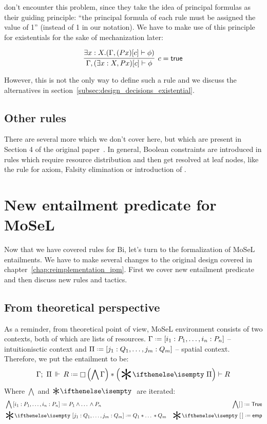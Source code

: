 \citet[page 5]{harlandResourceDistributionBooleanConstraints2003} don't encounter this problem, since they take the idea of principal formulas as their guiding principle: ``the principal formula of each rule must be assigned the value of 1'' (\true instead of 1 in our notation).
We have to make use of this principle for existentials for the sake of mechanization later:

\[
\infer[c = \true]
      {\Gamma, (\exists x : X, P x)[c] \vdash \phi}
      {\exists x : X . (\Gamma, (P x)[c] \vdash \phi)}
\]

However, this is not the only way to define such a rule and we discuss the alternatives in section~\ref{subsec:design_decisions_existential}.

\subsection{Other rules}
\label{subsec:other-rules}

There are several more which we don't cover here, but which are present in Section 4 of the original paper~\cite{harlandResourceDistributionBooleanConstraints2003}.
In general, Boolean constraints are introduced in rules which require resource distribution and then get resolved at leaf nodes, like the rule for axiom, Falsity elimination or introduction of \emp.

\section{New entailment predicate for MoSeL}

Now that we have covered rules for Bi, let's turn to the formalization of MoSeL entailments.
We have to make several changes to the original design covered in chapter~\ref{chap:reimplementation_ipm}.
First we cover new entailment predicate and then discuss new rules and tactics.

\subsection{From theoretical perspective}

As a reminder, from theoretical point of view, MoSeL environment consists of two contexts, both of which are lists of resources.
\(\IntuD \defeq \left[i_1 : P_1, \ldots , i_n : P_n \right]\) -- intuitionisctic context and \(\SpatD \defeq \left[j_1 : Q_1, \ldots , j_m : Q_m \right]\) -- spatial context.
Therefore, we put the entailment to be: \[\entailsD R \defeq \intuit \left(\bigwedge \IntuD\right) * \left(\Sep \SpatD\right) \vdash R\]
Where \(\bigwedge\) and \(\Sep\) are iterated:
\begin{align*}
  & \bigwedge  \left[i_1 : P_1, \ldots , i_n : P_n \right] \defeq P_1 \wedge \dots\, \wedge P_n
  & \bigwedge [\,] \defeq \True \\
  & \Sep {\left[j_1 : Q_1, \ldots , j_m : Q_m \right]} \defeq Q_1 * \dots\, * Q_m
  & \Sep {[\,]} \defeq \emp
\end{align*}

